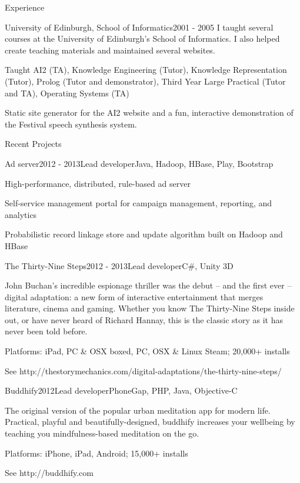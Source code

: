 \documentclass{resume} %
\begin{document}
\begin{rSection}{Experience}
\begin{rSubsection}{University of Edinburgh, School of Informatics}{2001 - 2005}
{I taught several courses at the University of Edinburgh's School of Informatics. I also helped create teaching materials and maintained several websites.}{}
\item Taught AI2 (TA), Knowledge Engineering (Tutor), Knowledge Representation (Tutor), Prolog (Tutor and demonstrator), Third Year Large Practical (Tutor and TA), Operating Systems (TA)
\item Static site generator for the AI2 website and a fun, interactive demonstration of the Festival speech synthesis system.
\end{rSubsection}

\end{rSection}



\begin{rSection}{Recent Projects}
\begin{rSubsection}{Ad server}{2012 - 2013}{Lead developer}{Java, Hadoop, HBase, Play, Bootstrap}
\item High-performance, distributed, rule-based ad server
\item Self-service management portal for campaign management, reporting, and analytics
\item Probabilistic record linkage store and update algorithm built on Hadoop and HBase
\end{rSubsection}

\begin{rSubsection}{The Thirty-Nine Steps}{2012 - 2013}{Lead developer}{C\#, Unity 3D}
\item John Buchan’s incredible espionage thriller was the debut – and the first ever – digital adaptation: a new form of interactive entertainment that merges literature, cinema and gaming. Whether you know The Thirty-Nine Steps inside out, or have never heard of Richard Hannay, this is the classic story as it has never been told before.
\item Platforms: iPad, PC \& OSX boxed, PC, OSX \& Linux Steam; 20,000+ installs
\item See http://thestorymechanics.com/digital-adaptations/the-thirty-nine-steps/
\end{rSubsection}

\begin{rSubsection}{Buddhify}{2012}{Lead developer}{PhoneGap, PHP, Java, Objective-C}
\item The original version of the popular urban meditation app for modern life. Practical, playful and beautifully-designed, buddhify increases your wellbeing by teaching you mindfulness-based meditation on the go.
\item Platforms: iPhone, iPad, Android; 15,000+ installs
\item See http://buddhify.com
\end{rSubsection}
\end{rSection}
\end{document}

